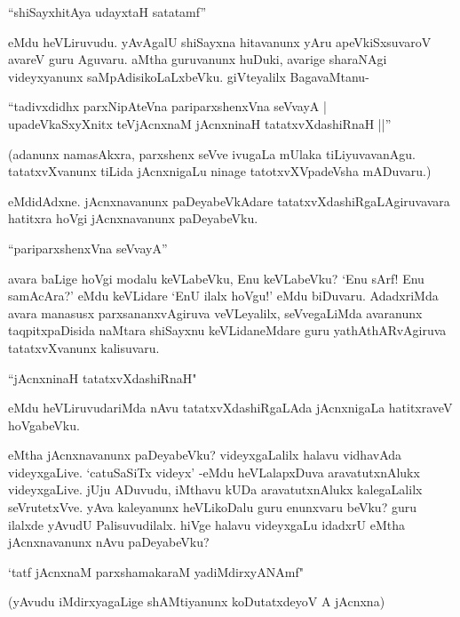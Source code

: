 \begin{shloka} 
``shiSayxhitAya udayxtaH satatamf'' 
\end{shloka}

\noindent eMdu heVLiruvudu. yAvAgalU shiSayxna hitavanunx yAru apeVkiSxsuvaroV avareV guru Aguvaru. aMtha guruvanunx huDuki, avarige sharaNAgi videyxyanunx saMpAdisikoLaLxbeVku. giVteyalilx BagavaMtanu-

\begin{shloka}
``tadivxdidhx parxNipAteVna pariparxshenxVna seVvayA |\\
upadeVkaSxyXnitx teVjAcnxnaM jAcnxninaH tatatxvXdashiRnaH ||''
\end{shloka}

(adanunx namasAkxra, parxshenx seVve ivugaLa mUlaka tiLiyuvavanAgu. tatatxvXvanunx tiLida jAcnxnigaLu ninage tatotxvXVpadeVsha mADuvaru.)

eMdidAdxne. jAcnxnavanunx paDeyabeVkAdare tatatxvXdashiRgaLAgiruvavara hatitxra hoVgi jAcnxnavanunx paDeyabeVku.

\begin{shloka}
``pariparxshenxVna seVvayA''
\end{shloka}

avara baLige hoVgi modalu keVLabeVku, Enu keVLabeVku? `Enu sArf! Enu samAcAra?' eMdu keVLidare `EnU ilalx hoVgu!' eMdu biDuvaru. AdadxriMda avara manasusx parxsananxvAgiruva veVLeyalilx, seVvegaLiMda avaranunx taqpitxpaDisida naMtara shiSayxnu keVLidaneMdare guru yathAthARvAgiruva tatatxvXvanunx kalisuvaru. 

\begin{shloka}
``jAcnxninaH tatatxvXdashiRnaH"
\end{shloka}

\noindent eMdu heVLiruvudariMda nAvu tatatxvXdashiRgaLAda jAcnxnigaLa hatitxraveV hoVgabeVku.

eMtha jAcnxnavanunx paDeyabeVku? videyxgaLalilx halavu vidhavAda videyxgaLive. `catuSaSiTx videyx' -eMdu heVLalapxDuva aravatutxnAlukx videyxgaLive. jUju ADuvudu, iMthavu kUDa aravatutxnAlukx kalegaLalilx seVrutetxVve. yAva kaleyanunx heVLikoDalu guru enunxvaru beVku? guru ilalxde yAvudU Palisuvudilalx. hiVge halavu videyxgaLu idadxrU eMtha jAcnxnavanunx nAvu paDeyabeVku? 

\begin{shloka}
`tatf jAcnxnaM parxshamakaraM yadiMdirxyANAmf" 
\end{shloka}

(yAvudu iMdirxyagaLige shAMtiyanunx koDutatxdeyoV A jAcnxna)


